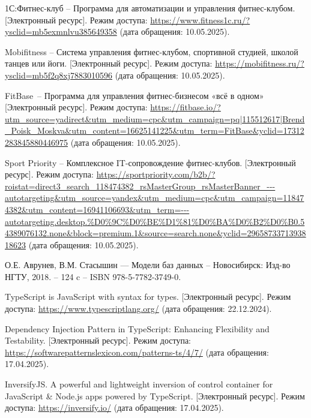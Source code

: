 \renewcommand\bibname{СПИСОК ИСПОЛЬЗОВАННЫХ ИСТОЧНИКОВ}

\begin{thebibliography}{}

    1С:Фитнес-клуб -- Программа для автоматизации и управления фитнес-клубом. [Электронный ресурс]. Режим доступа: 
    \url{https://www.fitness1c.ru/?ysclid=mb5exmnlvu385649358} (дата обращения: 10.05.2025).

    Mobifitness -- Система управления фитнес-клубом, спортивной студией, школой танцев или йоги. 
    [Электронный ресурс]. Режим доступа: \url{https://mobifitness.ru/?ysclid=mb5f2q8xj7883010596} (дата обращения: 10.05.2025).

    FitBase~-- Программа для управления фитнес-бизнесом «всё в одном» [Электронный ресурс]. Режим доступа: 
    \url{https://fitbase.io/?utm\_source=yadirect\&utm\_medium=cpc\&utm\_campaign=pq|115512617|Brend\_Poisk\_Moskva\&utm\_content=16625141225\&utm\_term=FitBase\&yclid=17312283845880446975} (дата обращения: 10.05.2025).

    Sport Priority -- Комплексное IT-сопровождение фитнес-клубов. [Электронный ресурс]. Режим доступа: 
    \url{https://sportpriority.com/b2b/?roistat=direct3_search_118474382_rsMasterGroup_rsMasterBanner_---autotargeting&utm_source=yandex&utm_medium=cpc&utm_campaign=118474382&utm_content=16941106693&utm_term=---autotargeting.desktop.%D0%9C%D0%BE%D1%81%D0%BA%D0%B2%D0%B0.54389076132.none&block=premium.1&source=search.none&yclid=2965873371393818623} (дата обращения: 10.05.2025).

    О.Е. Аврунев, В.М. Стасышин —  Модели баз данных – Новосибирск: Изд-во НГТУ, 2018. – 124 c 
    -- ISBN 978-5-7782-3749-0.

    TypeScript is JavaScript with syntax for types. [Электронный ресурс]. Режим доступа: 
    \url{https://www.typescriptlang.org/} (дата обращения: 22.12.2024).

    Dependency Injection Pattern in TypeScript: Enhancing Flexibility and Testability. [Электронный ресурс]. Режим доступа: 
    \url{https://softwarepatternslexicon.com/patterns-ts/4/7/} (дата обращения: 17.04.2025).

    InversifyJS. A powerful and lightweight inversion of control container for JavaScript \& Node.js apps powered by TypeScript. [Электронный ресурс]. Режим доступа: 
    \url{https://inversify.io/} (дата обращения: 17.04.2025).


\end{thebibliography}
